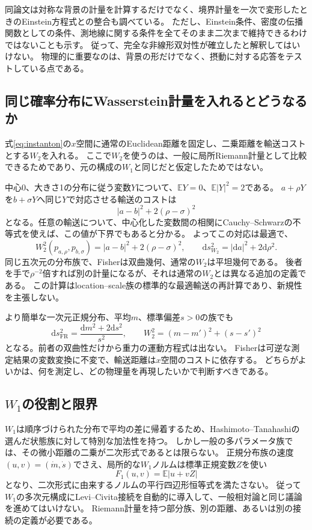 \documentclass[a4paper,11pt]{ltjsarticle}
\numberwithin{equation}{section}
\newcommand{\dd}{\mathrm d}
\newcommand{\E}{\mathbb E}
\newcommand{\FR}{\mathrm{FR}}
\begin{document}
同論文は対称な背景の計量を計算するだけでなく、境界計量を一次で変形したときのEinstein方程式との整合も調べている。
ただし、Einstein条件、密度の伝播関数としての条件、測地線に関する条件を全てそのまま二次まで維持できるわけではないことも示す\cite{BNT}。
従って、完全な非線形双対性が確立したと解釈してはいけない。
物理的に重要なのは、背景の形だけでなく、摂動に対する応答をテストしている点である。

\subsection{同じ確率分布にWasserstein計量を入れるとどうなるか}
式\eqref{eq:instanton}の$x$空間に通常のEuclidean距離を固定し、二乗距離を輸送コストとする$W_2$を入れる。
ここで$W_2$を使うのは、一般に局所Riemann計量として比較できるためであり、元の構成の$W_1$と同じだと仮定したためではない。

中心0、大きさ1の分布に従う変数$Y$について、$\E Y=0$、$\E|Y|^2=2$である。
$a+\rho Y$を$b+\sigma Y$へ同じ$Y$で対応させる輸送のコストは
\begin{equation}
 |a-b|^2+2(\rho-\sigma)^2
 \label{eq:w2cost}
\end{equation}
となる。任意の輸送について、中心化した変数間の相関にCauchy--Schwarzの不等式を使えば、この値が下界でもあると分かる。
よってこの対応は最適で、
\begin{equation}
 W_2^2(p_{a,\rho},p_{b,\sigma})=|a-b|^2+2(\rho-\sigma)^2,
 \qquad \dd s_{W_2}^2=|\dd a|^2+2\dd\rho^2.
 \label{eq:w2flat}
\end{equation}
同じ五次元の分布族で、Fisherは双曲幾何、通常の$W_2$は平坦幾何である。
後者を手で$\rho^{-2}$倍すれば別の計量になるが、それは通常の$W_2$とは異なる追加の定義である。
この計算はlocation--scale族の標準的な最適輸送の再計算であり、新規性を主張しない\cite{LiZhao}。

より簡単な一次元正規分布、平均$m$、標準偏差$s>0$の族でも
\begin{equation}
 \dd s_{\FR}^2=\frac{\dd m^2+2\dd s^2}{s^2},\qquad
 W_2^2= (m-m')^2+(s-s')^2
 \label{eq:normal}
\end{equation}
となる。前者の双曲性だけから重力の運動方程式は出ない\cite{EGJ}。
Fisherは可逆な測定結果の変数変換に不変で、輸送距離は$x$空間のコストに依存する。
どちらがよいかは、何を測定し、どの物理量を再現したいかで判断すべきである。

\subsection{$W_1$の役割と限界}
$W_1$は順序づけられた分布で平均の差に帰着するため、Hashimoto--Tanahashiの選んだ状態族に対して特別な加法性を持つ\cite{HT}。
しかし一般の多パラメータ族では、その微小距離の二乗が二次形式であるとは限らない。
正規分布族の速度$(u,v)=(\dot m,\dot s)$でさえ、局所的な$W_1$ノルムは標準正規変数$Z$を使い
\begin{equation}
 F_1(u,v)=\E|u+vZ|
 \label{eq:w1norm}
\end{equation}
となり、二次形式に由来するノルムの平行四辺形恒等式を満たさない。
従って$W_1$の多次元構成にLevi--Civita接続を自動的に導入して、一般相対論と同じ議論を進めてはいけない。
Riemann計量を持つ部分族、別の距離、あるいは別の接続の定義が必要である。
\end{document}
